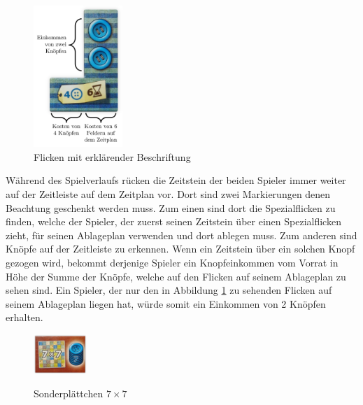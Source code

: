 \begin{figure}[!ht]
    \centering
    \includegraphics[width=0.3\textwidth]{res/pictures/annotated_patch.png}
    \caption{Flicken mit erklärender Beschriftung}
    \label{fig:patch-explanation}
\end{figure}

Während des Spielverlaufs rücken die Zeitstein der beiden Spieler immer weiter auf der Zeitleiste auf dem Zeitplan vor. Dort sind zwei Markierungen denen Beachtung geschenkt werden muss. Zum einen sind dort die Spezialflicken zu finden, welche der Spieler, der zuerst seinen Zeitstein über einen Spezialflicken zieht, für seinen Ablageplan verwenden und dort ablegen muss. Zum anderen sind Knöpfe auf der Zeitleiste zu erkennen. Wenn ein Zeitstein über ein solchen Knopf gezogen wird, bekommt derjenige Spieler ein Knopfeinkommen vom Vorrat in Höhe der Summe der Knöpfe, welche auf den Flicken auf seinem Ablageplan zu sehen sind. Ein Spieler, der nur den in Abbildung \ref{fig:patch-explanation} zu sehenden Flicken auf seinem Ablageplan liegen hat, würde somit ein Einkommen von 2 Knöpfen erhalten. \cite{2014.PatchworkSpielanleitung}

\pagebreak

\begin{figure}
    \centering
    \includegraphics[width=0.18\textwidth]{res/pictures/assets/special_tile_with_shadow.png}
    \caption[Sonderplättchen $7\times7$]{\unskip}
    Sonderplättchen $7\times7$
    \label{fig:special-tile}
\end{figure}

